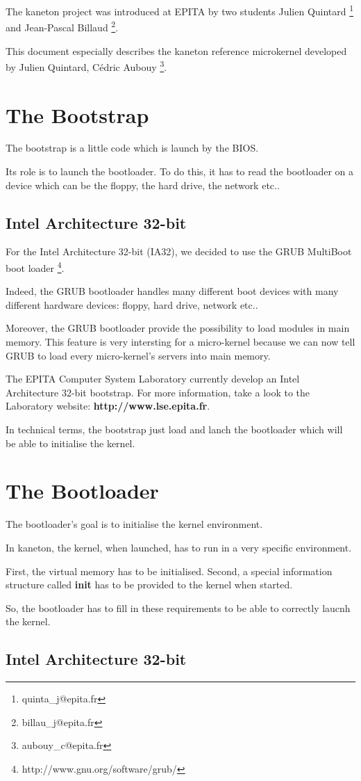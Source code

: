 \documentclass[10pt,a4wide]{article}
\begin{document}
The kaneton project was introduced at EPITA by two students
	Julien Quintard
	  \footnote{quinta\_j@epita.fr} and
	Jean-Pascal Billaud
	  \footnote{billau\_j@epita.fr}.

This document especially describes the kaneton reference microkernel
developed by
	Julien Quintard,
	C\'edric Aubouy
	  \footnote{aubouy\_c@epita.fr}.



\section{The Bootstrap}

The bootstrap is a little code which is launch by the BIOS.

Its role is to launch the bootloader. To do this, it has to read the
bootloader on a device which can be the floppy, the hard drive,
the network etc..

\subsection{Intel Architecture 32-bit}

For the Intel Architecture 32-bit (IA32), we decided to use the
	GRUB MultiBoot boot loader
	  \footnote{http://www.gnu.org/software/grub/}.

Indeed, the GRUB bootloader handles many different boot devices with
many different hardware devices: floppy, hard drive, network etc..

Moreover, the GRUB bootloader provide the possibility to load
modules in main memory. This feature is very intersting for a micro-kernel
because we can now tell GRUB to load every micro-kernel's servers into
main memory.

The EPITA Computer System Laboratory currently develop an Intel Architecture
32-bit bootstrap. For more information, take a look to the Laboratory
website: \textbf{http://www.lse.epita.fr}.

In technical terms, the bootstrap just load and lanch the bootloader
which will be able to initialise the kernel.



\section{The Bootloader}

The bootloader's goal is to initialise the kernel environment.

In kaneton, the kernel, when launched, has to run in a very specific
environment.

First, the virtual memory has to be initialised. Second, a special
information structure called \textbf{init} has to be provided to
the kernel when started.

So, the bootloader has to fill in these requirements to be able
to correctly laucnh the kernel.

\subsection{Intel Architecture 32-bit}
\end{document}
